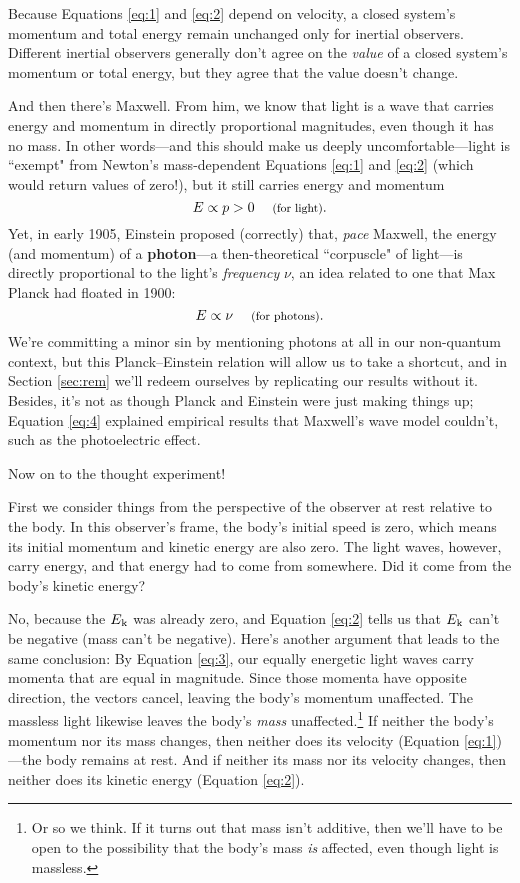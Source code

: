 \documentclass[12pt]{article}
\begin{document}
Because Equations \ref{eq:1} and \ref{eq:2} depend on velocity, a closed system's momentum and total energy remain unchanged only for inertial observers. Different inertial observers generally don't agree on the \emph{value} of a closed system's momentum or total energy, but they agree that the value doesn't change.

And then there's Maxwell. From him, we know that light is a wave that carries energy and momentum in directly proportional magnitudes, even though it has no mass. In other words---and this should make us deeply uncomfortable---light is ``exempt" from Newton's mass-dependent Equations \ref{eq:1} and \ref{eq:2} (which would return values of zero!), but it still carries energy and momentum
\begin{equation}\label{eq:3}
E \propto p >0 \quad \text{\footnotesize{ (for light)}} .
\end{equation}
Yet, in early 1905, Einstein proposed (correctly) that, \emph{pace} Maxwell, the energy (and momentum) of a \textbf{photon}---a then-theoretical ``corpuscle" of light---is directly proportional to the light's \emph{frequency} $\nu$, an idea related to one that Max Planck had floated in 1900:
\begin{equation}\label{eq:4}
E \propto \nu \quad \text{\footnotesize{ (for photons)}}.
\end{equation}
We're committing a minor sin by mentioning photons at all in our non-quantum context, but this Planck--Einstein relation will allow us to take a shortcut, and in Section \ref{sec:rem} we'll redeem ourselves by replicating our results without it. Besides, it's not as though Planck and Einstein were just making things up; Equation \ref{eq:4} explained empirical results that Maxwell's wave model couldn't, such as the photoelectric effect.

Now on to the thought experiment!

First we consider things from the perspective of the observer at rest relative to the body. In this observer's frame, the body's initial speed is zero, which means its initial momentum and kinetic energy are also zero. The light waves, however, carry energy, and that energy had to come from somewhere. Did it come from the body's kinetic energy?

No, because the $E_{\mkern.5mu \textrm{k}}$ was already zero, and Equation \ref{eq:2} tells us that $E_{\mkern.5mu \textrm{k}}$ can't be negative (mass can't be negative). Here's another argument that leads to the same conclusion: By Equation \ref{eq:3}, our equally energetic light waves carry momenta that are equal in magnitude. Since those momenta have opposite direction, the vectors cancel, leaving the body's momentum unaffected. The massless light likewise leaves the body's \emph{mass} unaffected.\footnote{\label{fn:ma}Or so we think. If it turns out that mass isn't additive, then we'll have to be open to the possibility that the body's mass \emph{is} affected, even though light is massless.} If neither the body's momentum nor its mass changes, then neither does its velocity (Equation \ref{eq:1})---the body remains at rest. And if neither its mass nor its velocity changes, then neither does its kinetic energy (Equation \ref{eq:2}).
\end{document}
